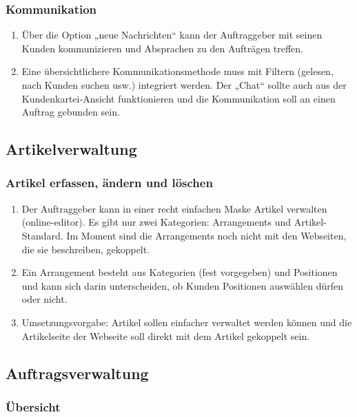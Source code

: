 \subsubsection{Kommunikation}

\begin{enumerate}
	\item Über die Option „neue Nachrichten“ kann der Auftraggeber mit seinen Kunden kommunizieren und Absprachen zu den Aufträgen treffen.
	\item Eine übersichtlichere Kommunikationsmethode muss mit Filtern (gelesen, nach Kunden suchen usw.) integriert werden. Der „Chat“ sollte auch aus der Kundenkartei-Ansicht funktionieren und die Kommunikation soll an einen Auftrag gebunden sein.
\end{enumerate} 


\subsection{Artikelverwaltung}

\subsubsection{Artikel erfassen, ändern und löschen}

\begin{enumerate}
	\item Der Auftraggeber kann in einer recht einfachen Maske Artikel verwalten (online-editor). Es gibt nur zwei Kategorien: Arrangements und Artikel-Standard. Im Moment sind die Arrangements noch nicht mit den Webseiten, die sie beschreiben, gekoppelt.
	\item Ein Arrangement besteht aus Kategorien (fest vorgegeben) und Positionen und kann sich darin unterscheiden, ob Kunden Positionen auswählen dürfen oder nicht.
	\item Umsetzungsvorgabe: Artikel sollen einfacher verwaltet werden können und die Artikelseite der Webseite soll direkt mit dem Artikel gekoppelt sein.
\end{enumerate} 


\subsection{Auftragsverwaltung}

\subsubsection{Übersicht}

